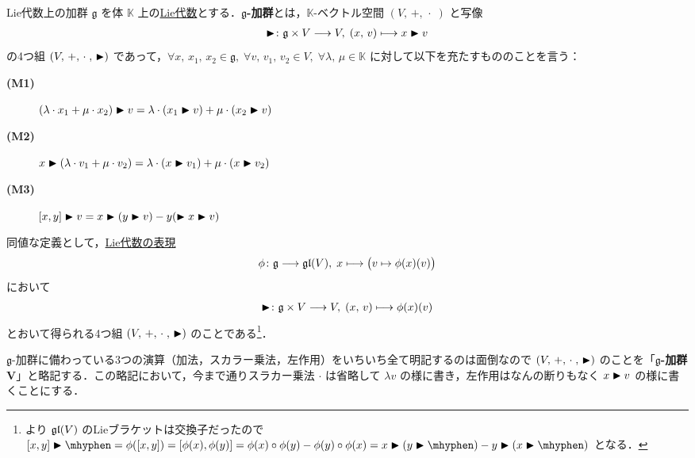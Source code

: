 \documentclass[rep_main]{subfiles}
\begin{document}
\begin{myaxiom}[label=ax:g-module]{Lie代数上の加群}
    $\mathfrak{g}$ を体 $\mathbb{K}$ 上の\hyperref[ax:LieAlg]{Lie代数}とする．$\bm{\mathfrak{g}}$\textbf{-加群}とは，$\mathbb{K}$-ベクトル空間 $(V,\, +,\, \cdot\;)$ と写像
    \begin{align}
        \blacktriangleright \colon \mathfrak{g} \times V \longrightarrow V,\; (x,\, v) \longmapsto x \blacktriangleright v
    \end{align}
    の4つ組 $(V,\, +,\, \cdot\;,\, \blacktriangleright)$ であって，$\forall x,\, x_1,\, x_2 \in \mathfrak{g},\; \forall v,\, v_1,\, v_2 \in V,\; \forall \lambda,\, \mu \in \mathbb{K}$ に対して以下を充たすもののことを言う：
    \begin{description}
        \item[\textbf{(M1)}] $(\lambda \cdot x_1 + \mu \cdot x_2) \blacktriangleright v = \lambda \cdot (x_1 \blacktriangleright v) + \mu \cdot (x_2 \blacktriangleright v)$
        \item[\textbf{(M2)}] $x \blacktriangleright (\lambda \cdot v_1 + \mu \cdot v_2) = \lambda \cdot (x \blacktriangleright v_1) + \mu \cdot (x \blacktriangleright v_2)$
        \item[\textbf{(M3)}] $\comm{x}{y} \btr v = x \btr (y \btr v) - y (\btr x \btr v)$
    \end{description}
    \tcblower
    同値な定義として，\hyperref[def:rep-LieAlg]{Lie代数の表現}
    \begin{align}
        \phi \colon \mathfrak{g} \longrightarrow \mathfrak{gl} (V),\; x \longmapsto \bigl( v \mapsto \phi(x)(v) \bigr) 
    \end{align}
    において
    \begin{align}
        \blacktriangleright \colon \mathfrak{g} \times V \longrightarrow V,\; (x,\, v) \longmapsto \phi(x)(v)
    \end{align}
    とおいて得られる4つ組 $(V,\, +,\, \cdot\;,\, \blacktriangleright)$ のことである\footnote{より $\mathfrak{gl} (V)$ のLieブラケットは交換子だったので $\comm{x}{y} \btr \mhyphen = \phi(\comm{x}{y}) = \comm{\phi(x)}{\phi(y)} = \phi(x) \circ \phi(y) - \phi(y) \circ \phi(x) = x \btr (y\btr \mhyphen) - y \btr (x \btr \mhyphen)$ となる．}．
\end{myaxiom}

\begin{marker}
    $\mathfrak{g}$-加群に備わっている3つの演算（加法，スカラー乗法，左作用）をいちいち全て明記するのは面倒なので $(V,\, +,\, \cdot\;,\, \blacktriangleright)$ のことを「$\bm{\mathfrak{g}}$\textbf{-加群} $\bm{V}$」と略記する．この略記において，今まで通りスラカー乗法 $\cdot$ は省略して $\lambda v$ の様に書き，左作用はなんの断りもなく $x \blacktriangleright v$ の様に書くことにする．
\end{marker}
\end{document}
